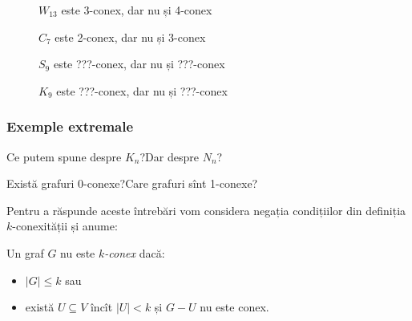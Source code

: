 \begin{frame}
\begin{minipage}{0.49\textwidth}
\begin{figure}
\caption{$W_{13}$ este 3-conex, dar nu și 4-conex}
\end{figure}
\end{minipage}\pause
%
\begin{minipage}{0.49\textwidth}
\begin{figure}
\caption{$C_7$ este 2-conex, dar nu și 3-conex}
\end{figure}
\end{minipage}\pause

\begin{minipage}{0.49\textwidth}
\begin{figure}
\caption{$S_9$ este ???-conex, dar nu și ???-conex} 
\end{figure}
\end{minipage}\pause
%
\begin{minipage}{0.49\textwidth}
\begin{figure}
\caption{$K_9$ este ???-conex, dar nu și ???-conex}
\end{figure}
\end{minipage}

\end{frame}

\begin{frame}
  \frametitle{Exemple extremale}

Ce putem spune despre $K_n$?\pause Dar despre $N_n$?\pause

Există grafuri 0-conexe?\pause Care grafuri sînt 1-conexe?\pause

Pentru a răspunde aceste întrebări vom considera negația condițiilor din definiția $k$-conexității și anume:\pause

Un graf $G$ nu este \emph{$k$-conex} dacă:
\begin{itemize}
  \item $|G|\leq k$ \alert{sau}
  \item există $U\subseteq V$ încît $|U|<k$ și $G-U$ nu este conex.
\end{itemize}

\end{frame}


